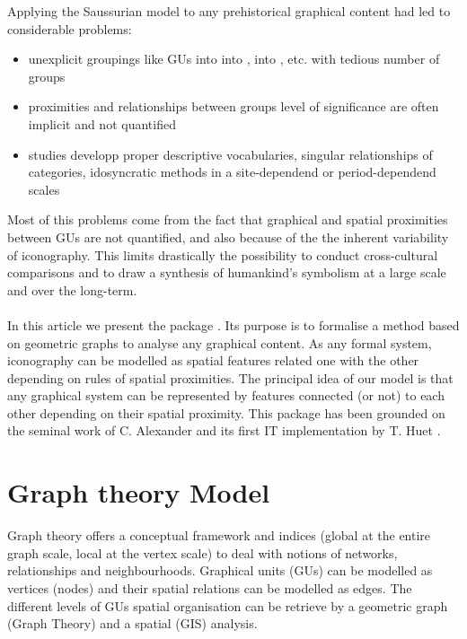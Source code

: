 \documentclass[article]{jss}\usepackage[]{graphicx}\usepackage[]{color}
\begin{document}
Applying the Saussurian model to any prehistorical graphical content had led to considerable problems:
\begin{itemize}
\setlength\itemsep{.1em}
  \item unexplicit groupings like GUs into    into ,  into , etc. with tedious number of groups
  \item proximities and relationships between groups level of significance are often implicit and not quantified
  \item studies developp proper descriptive vocabularies, singular relationships of categories, idosyncratic methods in a site-dependend or period-dependend scales 
\end{itemize}

Most of this problems come from the fact that graphical and spatial proximities between GUs are not quantified, and also because of the the inherent variability of iconography. This limits drastically the possibility to conduct cross-cultural comparisons and to draw a synthesis of humankind's symbolism at a large scale and over the long-term. 
\\
\\
In this article we present the  package . Its purpose is to formalise a method based on geometric graphs to analyse any graphical content. As any formal system, iconography can be modelled as spatial features related one with the other depending on rules of spatial proximities. The principal idea of our model is that any graphical system can be represented by features connected (or not) to each other depending on their spatial proximity. This package has been grounded on the seminal work of C. Alexander \citep{Alexander08} and its first IT implementation by T. Huet \citep{Huet18a}. 

\section[Model]{Graph theory Model} \label{sec:model}

Graph theory offers a conceptual framework and indices (global at the entire graph scale, local at the vertex scale) to deal with notions of networks, relationships and neighbourhoods. Graphical units (GUs) can be modelled as vertices (nodes) and their spatial relations can be modelled as edges. The different levels of GUs spatial organisation can be retrieve by a geometric graph (Graph Theory) and a spatial (GIS) analysis.
\end{document}
